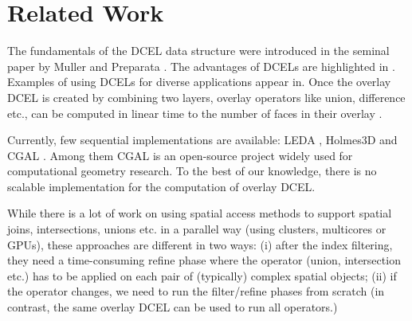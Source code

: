 \vspace{-5pt}
\section{Related Work}
\label{sec:related}
The fundamentals of the DCEL data structure were introduced in the seminal paper by Muller and Preparata  \cite{muller_finding_1978}. The advantages of DCELs are highlighted in \cite{preparata_computational_1985, berg_computational_2008}.
Examples of using DCELs for diverse applications appear in\cite{barequet_dcel_1998, boltcheva_topological-based_2020, freiseisen_colored_1998}. 
Once the overlay DCEL is created by combining two layers,  
overlay operators like union, difference etc., can be computed in linear time to the number of faces in their overlay \cite{freiseisen_colored_1998}. 

Currently, few sequential implementations are available: LEDA
\cite{mehlhorn_leda_1995}, Holmes3D
\cite{holmes_dcel_2021} and CGAL
\cite{fogel_cgal_2012}.  Among them CGAL is an open-source project widely used for computational geometry research. 
To the best of our knowledge, there is no scalable implementation for the computation of overlay DCEL.

While there is a lot of work on using spatial access methods to support spatial joins, intersections, unions etc. in a parallel way (using clusters, multicores or GPUs), \cite{challa_dd-rtree_2016, sabek_spatial_2017, li_scalable_2019, franklin_data_2018, magalhaes_fast_2015, puri_efficient_2013, puri_mapreduce_2013} these approaches are different in two ways: (i) after the index filtering, they need a time-consuming refine phase where the operator (union, intersection etc.) has to be applied on each pair of (typically) complex spatial objects; (ii) if the operator changes, we need to run the filter/refine phases from scratch (in contrast, the same overlay DCEL can be used to run all operators.)

